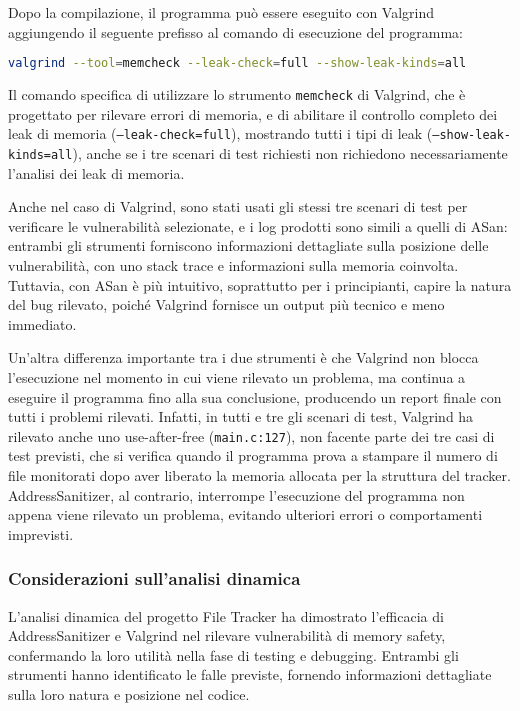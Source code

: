 Dopo la compilazione, il programma può essere eseguito con Valgrind aggiungendo
il seguente prefisso al comando di esecuzione del programma: \begin{lstlisting}[language=bash, numbers=none]
valgrind --tool=memcheck --leak-check=full --show-leak-kinds=all
\end{lstlisting}

Il comando specifica di utilizzare lo strumento \texttt{memcheck} di Valgrind,
che è progettato per rilevare errori di memoria, e di abilitare il controllo completo
dei leak di memoria (\texttt{--leak-check=full}), mostrando tutti i tipi di leak
(\texttt{--show-leak-kinds=all}), anche se i tre scenari di test richiesti non richiedono
necessariamente l'analisi dei leak di memoria.

Anche nel caso di Valgrind, sono stati usati gli stessi tre scenari di test per
verificare le vulnerabilità selezionate, e i log prodotti sono simili a quelli di
ASan: entrambi gli strumenti forniscono informazioni dettagliate sulla posizione
delle vulnerabilità, con uno stack trace e informazioni sulla memoria coinvolta.
Tuttavia, con ASan è più intuitivo, soprattutto per i principianti, capire la natura
del bug rilevato, poiché Valgrind fornisce un output più tecnico e meno
immediato.

Un'altra differenza importante tra i due strumenti è che Valgrind non blocca l'esecuzione
nel momento in cui viene rilevato un problema, ma continua a eseguire il programma
fino alla sua conclusione, producendo un report finale con tutti i problemi
rilevati. Infatti, in tutti e tre gli scenari di test, Valgrind ha rilevato anche
uno use-after-free (\texttt{main.c:127}), non facente parte dei tre casi di test
previsti, che si verifica quando il programma prova a stampare il numero di file
monitorati dopo aver liberato la memoria allocata per la struttura del tracker. AddressSanitizer,
al contrario, interrompe l'esecuzione del programma non appena viene rilevato un
problema, evitando ulteriori errori o comportamenti imprevisti.

\subsubsection*{Considerazioni sull'analisi dinamica}
L'analisi dinamica del progetto File Tracker ha dimostrato l'efficacia di
AddressSanitizer e Valgrind nel rilevare vulnerabilità di memory safety, confermando
la loro utilità nella fase di testing e debugging. Entrambi gli strumenti hanno
identificato le falle previste, fornendo informazioni dettagliate sulla loro natura
e posizione nel codice.

